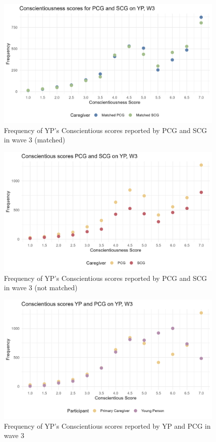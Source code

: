 \documentclass[a4paper]{article}
\begin{document}
\begin{figure}[htbp] 
    \centering
    \includegraphics[width=1\linewidth]{Matched Conscientious by participant w3.jpeg}
    \caption{Frequency of YP's Conscientious scores reported by PCG and SCG in wave 3 (matched)}
    \label{}
\end{figure}

\begin{figure}[htbp] 
    \centering
    \includegraphics[width=1\linewidth]{Frequency of Conscientious by participant w3.jpeg}
    \caption{Frequency of YP's Conscientious scores reported by PCG and SCG in wave 3 (not matched)}
    \label{}
\end{figure}

\begin{figure}[htbp] 
    \centering
    \includegraphics[width=1\linewidth]{Frequency of Conscientious by participant w3a.jpeg}
    \caption{Frequency of YP's Conscientious scores reported by YP and PCG in wave 3}
    \label{}
\end{figure}
\end{document}
